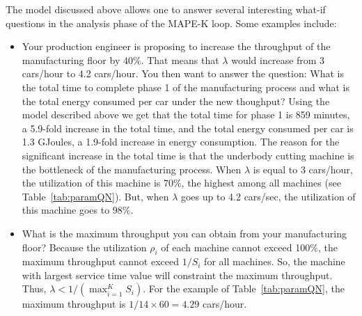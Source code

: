 \documentclass[a4paper, 12pt]{article} %
\begin{document}
The model discussed above allows one to answer several interesting what-if questions in the analysis phase of the MAPE-K loop. Some examples include: 
\begin{itemize}
\item Your production engineer is proposing to increase the throughput of the manufacturing floor by 40\%. That means that $\lambda$ would increase from 3 cars/hour to 4.2 cars/hour. You then want to answer the question: What is the total time to complete phase 1 of the manufacturing process and what is the total energy consumed per car under the new thoughput? Using the model described above we get that the total time for phase 1 is 859 minutes, a 5.9-fold increase in the total time, and the total energy consumed per car is 1.3  GJoules, a 1.9-fold increase in energy consumption. The reason for the significant increase in the total time is that the underbody cutting machine is the bottleneck of the manufacturing process. When $\lambda$ is equal to 3 cars/hour, the utilization of this machine is 70\%, the highest among all machines (see Table~\ref{tab:paramQN}).  But, when $\lambda$ goes up to 4.2 cars/sec, the utilization of this machine goes to 98\%.

\item What is the maximum throughput you can obtain from your manufacturing floor? Because the utilization $\rho_i$ of each machine cannot exceed 100\%, the maximum throughput cannot exceed $1 / S_i$ for all machines. So, the machine with largest service time value will constraint the maximum throughput. Thus, $\lambda < 1 / ({\max_{i=1}^K S_i})$. For the example of Table~\ref{tab:paramQN}, the maximum throughput  is $1 / 14  \times 60 = 4.29$ cars/hour.


\end{itemize}
\end{document}
